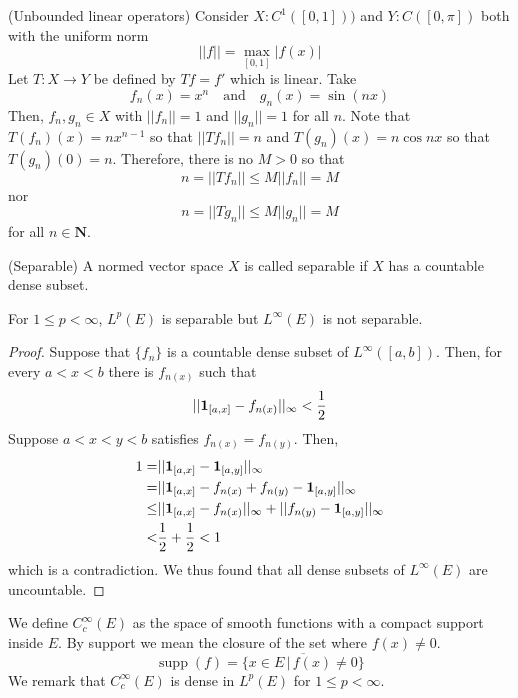 \vspace{2ex}
\begin{ex}
(Unbounded linear operators) Consider $X:C^{1}([0,1]))$ and $Y:C([0,\pi ])$ both with the uniform norm 
\[||f||=\max_{[0,1]}|f(x)|\]
Let $T:X\rightarrow Y$ be defined by $Tf=f'$ which is linear. Take
\[f_{n}(x)=x^{n}\quad \mathrm{and}\quad g_{n}(x)=\sin (nx)\]
Then, $f_{n},g_{n}\in X$ with $||f_{n}||=1$ and $||g_{n}||=1$ for all $n$. Note that $T(f_{n})(x)=nx^{n-1}$ so that $||Tf_{n}||=n$ and $T(g_{n})(x)=n\cos nx$ so that $T(g_{n})(0)=n$. Therefore, there is no $M>0$ so that 
\[n=||Tf_{n}||\leq M||f_{n}||=M\] nor
\[n=||Tg_{n}||\leq M||g_{n}||=M\]
for all $n\in {\bm N}$.
\end{ex}
\vspace{2ex}
\begin{defi}
(Separable) A normed vector space $X$ is called separable if $X$ has a countable dense subset. 
\end{defi}
\vspace{2ex}
\begin{rmk}
For $1\leq p<\infty $, $L^{p}(E)$ is separable but $L^{\infty }(E)$ is not separable.
\end{rmk}
\vspace{2ex}
\begin{proof}
Suppose that $\{f_{n}\}$ is a countable dense subset of $L^{\infty }([a,b])$. Then, for every $a<x<b$ there is $f_{n(x)}$ such that 
\[||{\bf 1}_{[a,x]}-f_{n(x)}||_{\infty }<\dfrac{1}{2}\]
Suppose $a<x<y<b$ satisfies $f_{n(x)}=f_{n(y)}$. Then, 
\begin{align*}
1=&||{\bf 1}_{[a,x]}-{\bf 1}_{[a,y]}||_{\infty }\\
=&||{\bf 1}_{[a,x]}-f_{n(x)}+f_{n(y)}-{\bf 1}_{[a,y]}||_{\infty }\\
\leq &||{\bf 1}_{[a,x]}-f_{n(x)}||_{\infty }+||f_{n(y)}-{\bf 1}_{[a,y]}||_{\infty }\\
<& \dfrac{1}{2}+\dfrac{1}{2}<1
\end{align*}
which is a contradiction. We thus found that all dense subsets of $L^{\infty }(E)$ are uncountable. 
\end{proof}
\vspace{2ex}
\begin{defi}
We define $C^{\infty }_{c}(E)$ as the space of smooth functions with a compact support inside $E$. By support we mean the closure of the set where $f(x)\ne 0$.
\[\mathop{\mathrm{supp}}(f)=\overline{\{x\in E \,|\, f(x)\ne 0 \}}\]
We remark that $C^{\infty }_{c}(E)$ is dense in $L^{p}(E)$ for $1\leq p< \infty $.
\end{defi}
\vspace{2ex}

